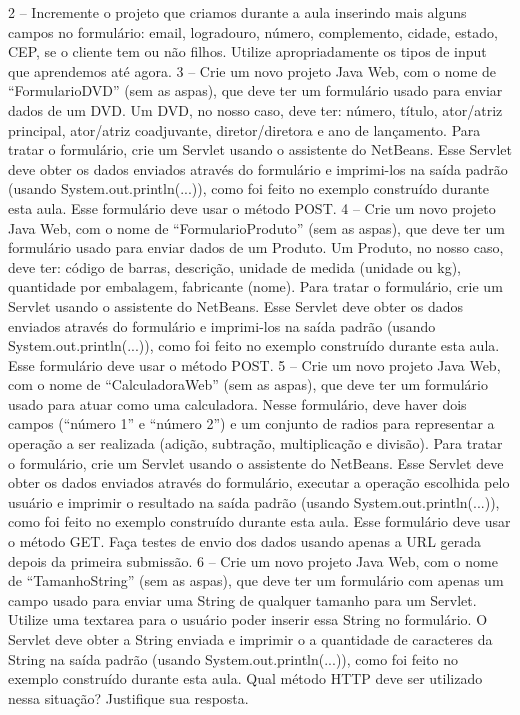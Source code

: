 2 – Incremente o projeto que criamos durante a aula inserindo mais alguns campos no formulário: email, logradouro, número, complemento, cidade, estado, CEP, se o cliente tem ou não filhos. Utilize apropriadamente os tipos de input que aprendemos até agora.
3 – Crie um novo projeto Java Web, com o nome de ``FormularioDVD'' (sem as aspas), que deve ter um formulário usado para enviar dados de um DVD. Um DVD, no nosso caso, deve ter: número, título, ator/atriz principal, ator/atriz coadjuvante, diretor/diretora e ano de lançamento. Para tratar o formulário, crie um Servlet usando o assistente do NetBeans. Esse Servlet deve obter os dados enviados através do formulário e imprimi-los na saída padrão (usando System.out.println(...)), como foi feito no exemplo construído durante esta aula. Esse formulário deve usar o método POST.
4 – Crie um novo projeto Java Web, com o nome de ``FormularioProduto'' (sem as aspas), que deve ter um formulário usado para enviar dados de um Produto. Um Produto, no nosso caso, deve ter: código de barras, descrição, unidade de medida (unidade ou kg), quantidade por embalagem, fabricante (nome). Para tratar o formulário, crie um Servlet usando o assistente do NetBeans. Esse Servlet deve obter os dados enviados através do formulário e imprimi-los na saída padrão (usando System.out.println(...)), como foi feito no exemplo construído durante esta aula. Esse formulário deve usar o método POST.
5 – Crie um novo projeto Java Web, com o nome de ``CalculadoraWeb'' (sem as aspas), que deve ter um formulário usado para atuar como uma calculadora. Nesse formulário, deve haver dois campos (``número 1'' e ``número 2'') e um conjunto de radios para representar a operação a ser realizada (adição, subtração, multiplicação e divisão). Para tratar o formulário, crie um Servlet usando o assistente do NetBeans. Esse Servlet deve obter os dados enviados através do formulário, executar a operação escolhida pelo usuário e imprimir o resultado na saída padrão (usando System.out.println(...)), como foi feito no exemplo construído durante esta aula. Esse formulário deve usar o método GET. Faça testes de envio dos dados usando apenas a URL gerada depois da primeira submissão.
6 – Crie um novo projeto Java Web, com o nome de ``TamanhoString'' (sem as aspas), que deve ter um formulário com apenas um campo usado para enviar uma String de qualquer tamanho para um Servlet. Utilize uma textarea para o usuário poder inserir essa String no formulário. O Servlet deve obter a String enviada e imprimir o a quantidade de caracteres da String na saída padrão (usando System.out.println(...)), como foi feito no exemplo construído durante esta aula. Qual método HTTP deve ser utilizado nessa situação? Justifique sua resposta.
